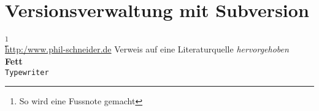 \section{Versionsverwaltung mit Subversion} \label{sec:impl-Versionsverwaltung}
\footnote{So wird eine Fussnote gemacht}\\
\url{http:/www.phil-schneider.de}
\citep{Frotscher2004b} Verweis auf eine Literaturquelle
\emph{hervorgehoben}\\
\textbf{Fett}\\
\texttt{Typewriter}\\


		







\label{sec:impl-Versionsverwaltung-ende}